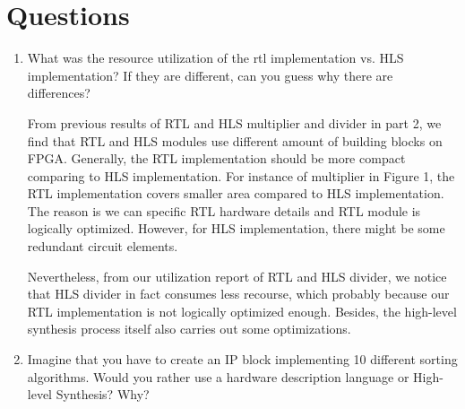 \documentclass[a4paper]{article}
\begin{document}
\section{Questions}
\begin{enumerate}
    \item What was the resource utilization of the rtl implementation vs. HLS implementation? If they are different, can you guess why there are differences?
    
    From previous results of RTL and HLS multiplier and divider in part 2, we find that RTL and HLS modules use different amount of building blocks on FPGA. Generally, the RTL implementation should be more compact comparing to HLS implementation. For instance of multiplier in Figure 1, the RTL implementation covers smaller area compared to HLS implementation. The reason is we can specific RTL hardware details and RTL module is logically optimized. However, for HLS implementation, there might be some redundant circuit elements. 
    
    Nevertheless, from our utilization report of RTL and HLS divider, we notice that HLS divider in fact consumes less recourse, which probably because our RTL implementation is not logically optimized enough. Besides, the high-level synthesis process itself also carries out some optimizations.
    \item Imagine that you have to create an IP block implementing 10 different sorting algorithms. Would you rather use a hardware description language or High-level Synthesis? Why?
    

\end{enumerate}
\end{document}
